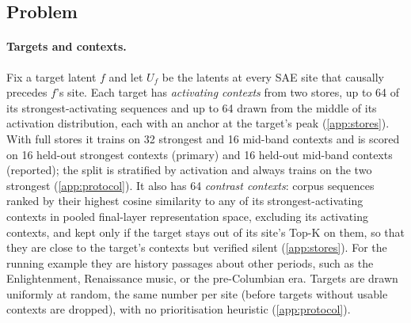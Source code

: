 \documentclass[10pt]{article}
\begin{document}
\subsection{Problem}
\label{sec:problem}
\label{sec:evidence}

\paragraph{Targets and contexts.}
Fix a target latent $f$ and let $U_f$ be the latents at every SAE site that causally precedes $f$'s site.
Each target has \emph{activating contexts} from two stores, up to 64 of its strongest-activating sequences and up to 64 drawn from the middle of its activation distribution, each with an anchor at the target's peak (\cref{app:stores}).
With full stores it trains on 32 strongest and 16 mid-band contexts and is scored on 16 held-out strongest contexts (primary) and 16 held-out mid-band contexts (reported); the split is stratified by activation and always trains on the two strongest (\cref{app:protocol}).
It also has 64 \emph{contrast contexts}: corpus sequences ranked by their highest cosine similarity to any of its strongest-activating contexts in pooled final-layer representation space, excluding its activating contexts, and kept only if the target stays out of its site's Top-K on them, so that they are close to the target's contexts but verified silent (\cref{app:stores}).
For the running example they are history passages about other periods, such as the Enlightenment, Renaissance music, or the pre-Columbian era.
Targets are drawn uniformly at random, the same number per site (before targets without usable contexts are dropped), with no prioritisation heuristic (\cref{app:protocol}).
\end{document}

